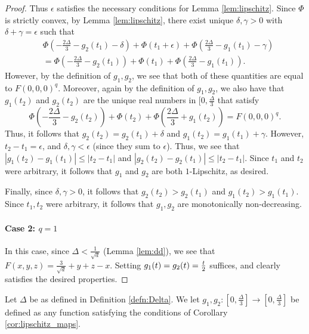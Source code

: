 \begin{proof}
Thus $\epsilon$ satisfies the necessary conditions for Lemma \ref{lem:lipschitz}. Since $\Phi$ is strictly convex, by Lemma \ref{lem:lipschitz}, there exist unique $\delta, \gamma > 0$ with $\delta+ \gamma = \epsilon$ such that 
\begin{equation*}
\begin{split}
&\Phi(-\frac{2\Delta}{3} - g_2(t_1) - \delta) + \Phi(t_1 + \epsilon) + \Phi(\frac{2\Delta}{3} - g_1(t_1) - \gamma)\\ &= \Phi(-\frac{2\Delta}{3} - g_2(t_1)) + \Phi(t_1) + \Phi(\frac{2\Delta}{3} - g_1(t_1)).
\end{split}
\end{equation*}
However, by the definition of $g_1, g_2$, we see that both of these quantities are equal to $F(0,0,0)^q$. Moreover, again by the definition of $g_1, g_2$, we also have that $g_1(t_2)$ and $g_2(t_2)$ are the unique real numbers in $[0, \frac{\Delta}{3}$ that satisfy $$\Phi(-\frac{2\Delta}{3} - g_2(t_2)) + \Phi(t_2) + \Phi(\frac{2\Delta}{3}+g_1(t_2)) = F(0,0,0)^q.$$ Thus, it follows that $g_2(t_2) = g_2(t_1) + \delta$ and $g_1(t_2) = g_1(t_1) + \gamma$. However, $t_2 - t_1 = \epsilon$, and $\delta, \gamma < \epsilon$ (since they sum to $\epsilon$). Thus, we see that $|g_1(t_2) - g_1(t_1)| \leq |t_2 - t_1|$ and $|g_2(t_2) - g_2(t_1)| \leq |t_2 - t_1|$. Since $t_1$ and $t_2$ were arbitrary, it follows that $g_1$ and $g_2$ are both $1$-Lipschitz, as desired. 

Finally, since $\delta, \gamma > 0$, it follows that $g_2(t_2) > g_2(t_1)$ and $g_1(t_2) > g_1(t_1)$. Since $t_1, t_2$ were arbitrary, it follows that $g_1, g_2$ are monotonically non-decreasing.

\paragraph{Case 2: $q = 1$} In this case, since $\Delta < \frac{1}{\sqrt{d}}$ (Lemma \ref{lem:dd}), we see that $F(x, y, z) = \frac{3}{\sqrt{d}} + y + z - x$. Setting $g_1(t) = g_2(t) = \frac{t}{2}$ suffices, and clearly satisfies the desired properties. 
\end{proof}

\begin{defn}\label{defn:g_1_and_g_2}
Let $\Delta$ be as defined in Definition \ref{defn:Delta}. We let $g_1, g_2: [0, \frac{\Delta}{3}] \to [0, \frac{\Delta}{3}]$ be defined as any function satisfying the conditions of Corollary \ref{cor:lipschitz_maps}.
\end{defn}

